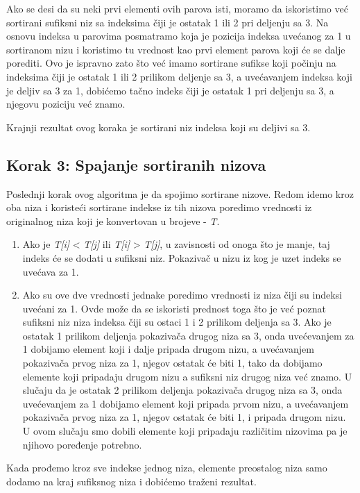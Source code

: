 \documentclass[serbian]{article}
\begin{document}
Ako se desi da su neki prvi elementi ovih parova isti, moramo da iskoristimo već sortirani sufiksni niz sa indeksima čiji je ostatak 1 ili 2 pri deljenju sa 3. Na osnovu indeksa u parovima posmatramo koja je pozicija indeksa uvećanog za 1 u sortiranom nizu i koristimo tu vrednost kao prvi element parova koji će se dalje porediti. Ovo je ispravno zato što već imamo sortirane sufikse koji počinju na indeksima čiji je ostatak 1 ili 2 prilikom deljenje sa 3, a uvećavanjem indeksa koji je deljiv sa 3 za 1, dobićemo tačno indeks čiji je ostatak 1 pri deljenju sa 3, a njegovu poziciju već znamo.

Krajnji rezultat ovog koraka je sortirani niz indeksa koji su deljivi sa 3.

\subsection{Korak 3: Spajanje sortiranih nizova}
Poslednji korak ovog algoritma je da spojimo sortirane nizove.
Redom idemo kroz oba niza i koristeći sortirane indekse iz tih nizova poredimo vrednosti iz originalnog niza koji je konvertovan u brojeve - \textit{T}.
\begin{enumerate}
    \item Ako je \textit{T[i]} < \textit{T[j]} ili \textit{T[i]} > \textit{T[j]}, u zavisnosti od onoga što je manje, taj indeks će se dodati u sufiksni niz. Pokazivač u nizu iz kog je uzet indeks se uvećava za 1.
    \item Ako su ove dve vrednosti jednake poredimo vrednosti iz niza čiji su indeksi uvećani za 1. Ovde može da se iskoristi prednost toga što je već poznat sufiksni niz niza indeksa čiji su ostaci 1 i 2 prilikom deljenja sa 3. Ako je ostatak 1 prilikom deljenja pokazivača drugog niza sa 3, onda uvećevanjem za 1 dobijamo element koji i dalje pripada drugom nizu, a uvećavanjem pokazivača prvog niza za 1, njegov ostatak će biti 1, tako da dobijamo elemente koji pripadaju drugom nizu a sufiksni niz drugog niza već znamo. U slučaju da je ostatak 2 prilikom deljenja pokazivača drugog niza sa 3, onda uvećevanjem za 1 dobijamo element koji pripada prvom nizu, a uvećavanjem pokazivača prvog niza za 1, njegov ostatak će biti 1, i pripada drugom nizu. U ovom slučaju smo dobili elemente koji pripadaju različitim nizovima pa je njihovo poređenje potrebno.
\end{enumerate}

Kada prođemo kroz sve indekse jednog niza, elemente preostalog niza samo dodamo na kraj sufiksnog niza i dobićemo traženi rezultat.
\end{document}
